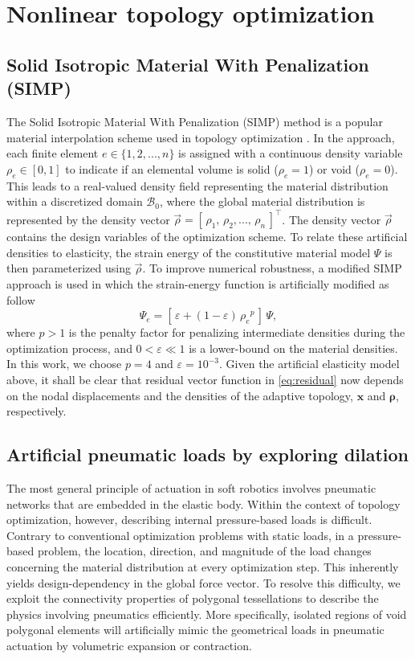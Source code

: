\section{Nonlinear topology optimization}
\label{chap:topo} 
\subsection{Solid Isotropic Material With Penalization (SIMP)}
The Solid Isotropic Material With Penalization (SIMP) method is a popular material interpolation scheme used in topology optimization \cite{Sigmund2015,Gain2013,Vasista2013}. In the approach, each finite element $e \in \{1,2,...,n\}$ is assigned with a continuous density variable $\rho_e \in [0,1]$ to indicate if an elemental volume is solid ($\rho_e = 1$) or void ($\rho_e = 0$). This leads to a real-valued density field representing the material distribution within a discretized domain $\mathcal{B}_0$, where the global material distribution is represented by the density vector $\vec{\rho} = \left[\,\rho_1,\,\rho_2,...,\,\rho_n\,\right]^\top$. The density vector $\vec{\rho}$ contains the design variables of the optimization scheme. To relate these artificial densities to elasticity, the strain energy of the constitutive material model ${\Psi}$ is then parameterized using $\vec{\rho}$. To improve numerical robustness, a modified SIMP approach is used in which the strain-energy function is artificially modified as follow 
%
\begin{equation}
{\Psi}_e = [\,\varepsilon + (1-\varepsilon)\,{\rho_e}^p\,]\, {\Psi}, \label{eq:simp}
\end{equation}
%
where $p>1$ is the penalty factor for penalizing intermediate densities during the optimization process, and $0 < \varepsilon \ll 1$ is a lower-bound on the material densities. In this work, we choose $p = 4$ and $\varepsilon = 10^{-3}$. Given the artificial elasticity model above, it shall be clear that residual vector function in \eqref{eq:residual} now depends on the nodal displacements and the densities of the adaptive topology, $\boldsymbol{x}$ and $\boldsymbol{\rho}$, respectively.

\subsection{Artificial pneumatic loads by exploring dilation}
The most general principle of actuation in soft robotics involves pneumatic networks that are embedded in the elastic body. Within the context of topology optimization, however, describing internal pressure-based loads is difficult. Contrary to conventional optimization problems with static loads, in a pressure-based problem, the location, direction, and magnitude of the load changes concerning the material distribution at every optimization step. This inherently yields design-dependency in the global force vector. To resolve this difficulty, we exploit the connectivity properties of polygonal tessellations to describe the physics involving pneumatics efficiently. More specifically, isolated regions of void polygonal elements will artificially mimic the geometrical loads in pneumatic actuation by volumetric expansion or contraction.

